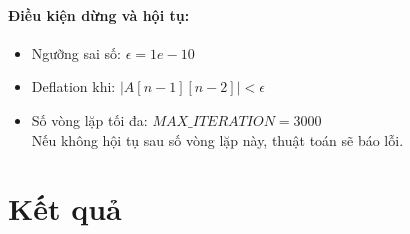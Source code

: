 \paragraph{Điều kiện dừng và hội tụ:}
\begin{itemize}[itemsep=2.5pt, leftmargin=1cm]
    \item Ngưỡng sai số: $\epsilon = 1e-10$
    
    \item Deflation khi: $|A[n - 1][n - 2]| < \epsilon$
    
    \item Số vòng lặp tối đa: $MAX\_ITERATION = 3000$ \\ Nếu không hội tụ sau số vòng lặp này, thuật toán sẽ báo lỗi.
\end{itemize}

\newpage

\section{Kết quả}

